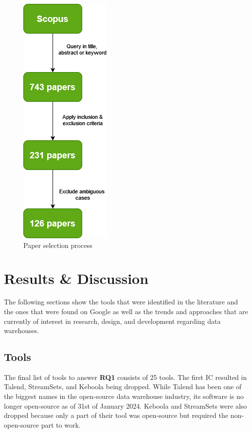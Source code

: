 \documentclass[11pt]{article}
\begin{document}
\begin{figure}
\centering
\includegraphics[scale=0.6]{Images/Trends.drawio.png}
\caption{Paper selection process}
\label{fig:trends}
\end{figure}

\section{Results \& Discussion}
\label{results}
The following sections show the tools that were identified in the literature and the ones that were found on Google as well as the trends and approaches that are currently of interest in research, design, and development regarding data warehouses. \\

\subsection{Tools}
\label{results:tools}
The final list of tools to answer \textbf{RQ1} consists of 25 tools. The first IC resulted in Talend, StreamSets, and Keboola being dropped. While Talend has been one of the biggest names in the open-source data warehouse industry, its software is no longer open-source as of 31st of January 2024. Keboola and StreamSets were also dropped because only a part of their tool was open-source but required the non-open-source part to work. \\
\end{document}
